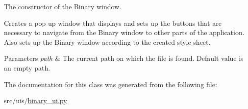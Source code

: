The constructor of the Binary window. 

Creates a pop up window that displays and sets up the buttons that are necessary to navigate from the Binary window to other parts of the application. Also sets up the Binary window according to the created style sheet. 
\begin{DoxyParams}{Parameters}
{\em path} & The current path on which the file is found. Default value is an empty path. \\
\hline
\end{DoxyParams}


The documentation for this class was generated from the following file\+:\begin{DoxyCompactItemize}
\item 
src/uis/\hyperlink{binary__ui_8py}{binary\+\_\+ui.\+py}\end{DoxyCompactItemize}
